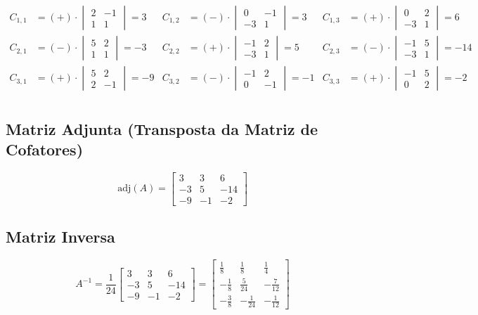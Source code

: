 \documentclass[a4paper,12pt]{article}
\begin{document}
\begin{align*}
C_{1,1} &= (+) \cdot \begin{vmatrix} 2 & -1 \\ 1 & 1 \end{vmatrix} = 3 &
C_{1,2} &= (-) \cdot \begin{vmatrix} 0 & -1 \\ -3 & 1 \end{vmatrix} = 3 &
C_{1,3} &= (+) \cdot \begin{vmatrix} 0 & 2 \\ -3 & 1 \end{vmatrix} = 6 \\
C_{2,1} &= (-) \cdot \begin{vmatrix} 5 & 2 \\ 1 & 1 \end{vmatrix} = -3 &
C_{2,2} &= (+) \cdot \begin{vmatrix} -1 & 2 \\ -3 & 1 \end{vmatrix} = 5 &
C_{2,3} &= (-) \cdot \begin{vmatrix} -1 & 5 \\ -3 & 1 \end{vmatrix} = -14 \\
C_{3,1} &= (+) \cdot \begin{vmatrix} 5 & 2 \\ 2 & -1 \end{vmatrix} = -9 &
C_{3,2} &= (-) \cdot \begin{vmatrix} -1 & 2 \\ 0 & -1 \end{vmatrix} = -1 &
C_{3,3} &= (+) \cdot \begin{vmatrix} -1 & 5 \\ 0 & 2 \end{vmatrix} = -2 \\
\end{align*}

\subsection*{Matriz Adjunta (Transposta da Matriz de Cofatores)}
\[
\text{adj}(A) = 
\begin{bmatrix}
3 & 3 & 6 \\
-3 & 5 & -14 \\
-9 & -1 & -2
\end{bmatrix}
\]

\subsection*{Matriz Inversa}
\[
A^{-1} = \frac{1}{24}
\begin{bmatrix}
3 & 3 & 6 \\
-3 & 5 & -14 \\
-9 & -1 & -2
\end{bmatrix}
=
\begin{bmatrix}
\frac{1}{8} & \frac{1}{8} & \frac{1}{4} \\
-\frac{1}{8} & \frac{5}{24} & -\frac{7}{12} \\
-\frac{3}{8} & -\frac{1}{24} & -\frac{1}{12}
\end{bmatrix}
\]
\end{document}
